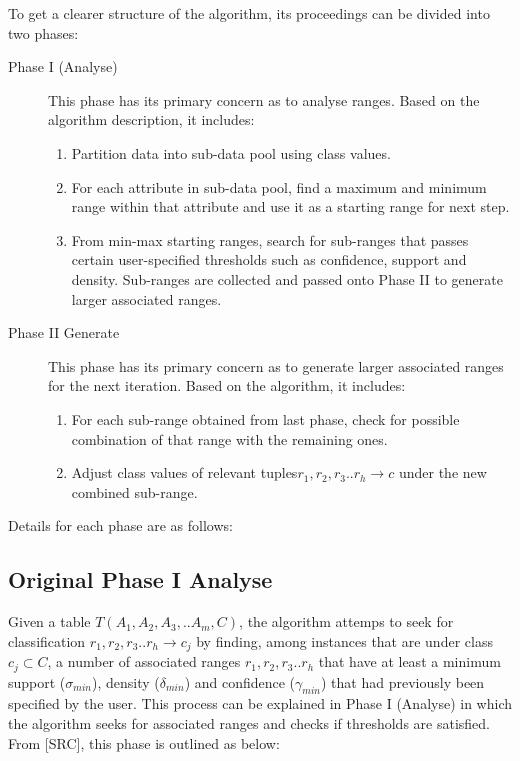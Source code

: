 To get a clearer structure of the algorithm, its proceedings can be divided into two phases:  

\begin{description}
\item[Phase I (Analyse)] 
This phase has its primary concern as to analyse ranges. Based on the algorithm description, it includes:
	\begin{enumerate}
	\item Partition data into sub-data pool using class values.
	\item For each attribute in sub-data pool, find a maximum and minimum range within that attribute and use it as a starting range for next step.
	\item From min-max starting ranges, search for sub-ranges that passes certain user-specified thresholds such as confidence, support and density. Sub-ranges are collected and passed onto Phase II to generate larger associated ranges.
	\end{enumerate}

\item[Phase II Generate] 
This phase has its primary concern as to generate larger associated ranges for the next iteration. Based on the algorithm, it includes:
	\begin{enumerate}
	\item For each sub-range obtained from last phase, check for possible combination of that range with the remaining ones.
	\item Adjust class values of relevant tuples$r_1, r_2, r_3..r_h \rightarrow c$ under the new combined sub-range.
	\end{enumerate}
\end{description}

Details for each phase are as follows:

\subsection{Original Phase I Analyse}

Given a table $T(A_1, A_2, A_3,..A_m, C)$, the algorithm attemps to seek for classification $r_1, r_2, r_3..r_h \rightarrow c_j$ by finding, among instances that are under class $c_j \subset C$, a number of associated ranges $r_1, r_2, r_3..r_h$ that have at least a minimum support ($\sigma_{min}$), density ($\delta_{min}$) and confidence ($\gamma_{min}$) that had previously been specified by the user. This process can be explained in Phase I (Analyse) in which the algorithm seeks for associated ranges and checks if thresholds are satisfied. From [SRC], this phase is outlined as below:

